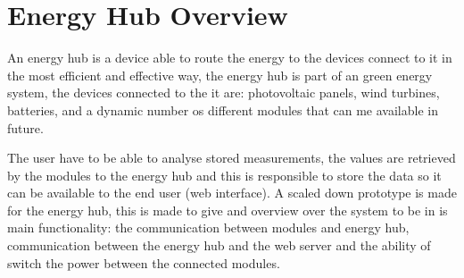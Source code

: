 \section{Energy Hub Overview}
An energy hub is a device able to route the energy to the devices connect to it in the most efficient and effective way, the energy hub is part of an green energy system, the devices connected to the it are: photovoltaic panels, wind turbines, batteries, and a dynamic number os different modules that can me available in future. 

The user have to be able to analyse stored measurements, the values are retrieved by the modules to the energy hub and this is responsible to store the data so it can be available to the end user (web interface). A scaled down prototype is made for the energy hub, this is made to give and overview over the system to be in is main functionality: the communication between modules and energy hub, communication between the energy hub and the web server and the ability of switch the power between the connected modules.